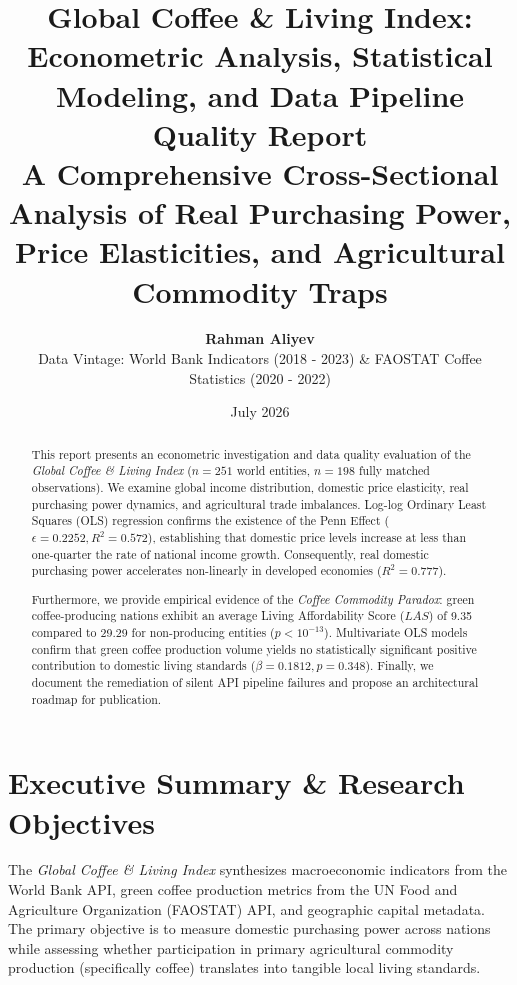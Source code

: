 \documentclass[11pt,a4paper]{article}
\title{\textbf{Global Coffee \& Living Index: Econometric Analysis, Statistical Modeling, and Data Pipeline Quality Report}\\
\large A Comprehensive Cross-Sectional Analysis of Real Purchasing Power, Price Elasticities, and Agricultural Commodity Traps}
\author{\textbf{Rahman Aliyev}\\
\small Data Vintage: World Bank Indicators (2018 - 2023) \& FAOSTAT Coffee Statistics (2020 - 2022)}
\date{July 2026}
\begin{document}
\maketitle

\begin{abstract}
\noindent This report presents an econometric investigation and data quality evaluation of the \emph{Global Coffee \& Living Index} ($n=251$ world entities, $n=198$ fully matched observations). We examine global income distribution, domestic price elasticity, real purchasing power dynamics, and agricultural trade imbalances. Log-log Ordinary Least Squares (OLS) regression confirms the existence of the Penn Effect ($\epsilon = 0.2252, R^2 = 0.572$), establishing that domestic price levels increase at less than one-quarter the rate of national income growth. Consequently, real domestic purchasing power accelerates non-linearly in developed economies ($R^2 = 0.777$). 

Furthermore, we provide empirical evidence of the \emph{Coffee Commodity Paradox}: green coffee-producing nations exhibit an average Living Affordability Score ($LAS$) of 9.35 compared to 29.29 for non-producing entities ($p < 10^{-13}$). Multivariate OLS models confirm that green coffee production volume yields no statistically significant positive contribution to domestic living standards ($\beta = 0.1812, p = 0.348$). Finally, we document the remediation of silent API pipeline failures and propose an architectural roadmap for publication.
\end{abstract}




\newpage
\tableofcontents
\newpage


\section{Executive Summary \& Research Objectives}


The \emph{Global Coffee \& Living Index} synthesizes macroeconomic indicators from the World Bank API, green coffee production metrics from the UN Food and Agriculture Organization (FAOSTAT) API, and geographic capital metadata. The primary objective is to measure domestic purchasing power across nations while assessing whether participation in primary agricultural commodity production (specifically coffee) translates into tangible local living standards.
\end{document}
